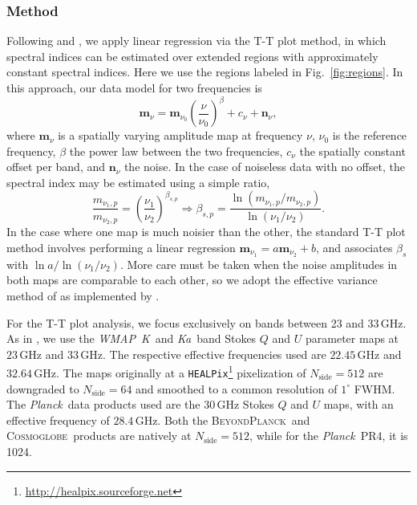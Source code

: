 \documentclass[twocolumn]{../../common/aa}
\def\WMAP{\emph{WMAP}}
\def\Planck{\emph{Planck}}
\def\healpix{\texttt{HEALPix}}
\newcommand{\bp}{\textsc{BeyondPlanck}}
\newcommand{\cosmoglobe}{\textsc{Cosmoglobe}}
\newcommand{\K}[0]{\textit K}
\newcommand{\Ka}[0]{\textit{Ka}}
\begin{document}
\subsubsection{Method}
\label{sec:tt_plot_method}

Following \citet{fuskeland2014} and \citet{fuskeland:2019}, we apply linear regression via the T-T plot method, in which spectral indices can be estimated over extended regions with approximately constant spectral indices. Here we use the regions labeled in Fig.~\ref{fig:regions}. In this approach, our data model for two frequencies is
\begin{equation}
	\boldsymbol m_\nu = \boldsymbol m_{\nu_0}\left(\frac\nu{\nu_0}\right)^\beta+c_\nu+\boldsymbol n_\nu ,
\end{equation}
where $\boldsymbol m_\nu$ is a spatially varying amplitude map at frequency $\nu$, $\nu_0$ is the reference frequency, $\beta$ the power law between the two frequencies, $c_\nu$ the spatially constant offset per band, and $\boldsymbol n_\nu$ the noise.  In the case of noiseless data with no offset, the spectral index may be estimated using a simple ratio,
\begin{equation}
	\frac{m_{\nu_1,p}}{m_{\nu_2,p}}
	=\left(\frac{\nu_1}{\nu_2}\right)^{\beta_{s,p}}
	\Rightarrow
	\beta_{s,p}=\frac{\ln(m_{\nu_1,p}/m_{\nu_2,p})}{\ln(\nu_1/\nu_2)}.
\end{equation}
In the case where one map is much noisier than the other, the standard T-T plot method involves performing  a linear regression $\boldsymbol m_{\nu_1}=a\boldsymbol m_{\nu_2}+b$, and associates $\beta_s$ with $\ln a/\ln(\nu_1/\nu_2)$. More care must be taken when the noise amplitudes in both maps are comparable to each other, so we adopt the effective variance method of \citet{orear1982} as implemented by \citet{fuskeland2014}.

For the T-T plot  analysis, we focus exclusively on bands between 23 and 33\,GHz. As in \citet{fuskeland2014}, we use the \WMAP\ \K\ and \Ka\ band Stokes $Q$ and $U$ parameter maps at $23$\,GHz and $33$\,GHz. The respective effective frequencies used are $22.45$\,GHz and $32.64$\,GHz. The maps originally at a \healpix\footnote{\url{http://healpix.sourceforge.net}} pixelization of $N_\textrm{side}=512$ are downgraded to $N_\textrm{side}=64$ and smoothed to a common resolution of $1^\circ$ FWHM.
The \Planck\ data products used are the $30$\,GHz Stokes $Q$ and $U$ maps, with an effective frequency of $28.4$\,GHz. Both the \bp\ and \cosmoglobe\ products are natively at $N_\textrm{side}=512$, while for the \Planck\ PR4, it is 1024.
\end{document}
